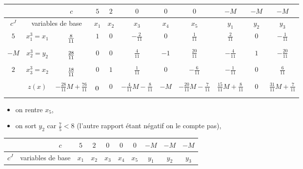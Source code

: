 \begin{td-sol}[]
\begin{enumerate}
\begin{center}
\begin{tabular}{|ccc|cccccccc|}
                \hline  %
                & \ &\(c\)&\(5\)&\(2\)&\(0\)&\(0\)&\(0\)&\(-M\)&\(-M\)&\(-M\)\\
                \hline %
                \multicolumn{1}{|c|}{\(c^J\)}& \multicolumn{2}{c|}{variables de base}&\(x_1\)&\(x_2\)&\(x_3\)&\(x_4\)&\(x_5\)&\(y_1\)&\(y_2\)&\(y_3\)\\
                \hline %
                \multicolumn{1}{|c|}{\(5\)}& \multicolumn{1}{c|}{\(x_1^{3}=x_1\)} &\(\vphantom{\dfrac16}\frac{8}{11}\)&\(1\)&\(0\)&\(-\frac{2}{11}\)&\(0\)&\(\frac{1}{11}\)&\(\frac{2}{11}\)&\(0\)&\(-\frac{1}{11}\)\\
                \hline %
                \multicolumn{1}{|c|}{\(-M\)}& \multicolumn{1}{c|}{\(x_2^{3}=y_2\)} &\(\vphantom{\dfrac16}\frac{28}{11}\)&\(0\)&\(0\)&\(\frac{4}{11}\)&\(-1\)&\(\frac{20}{11}\)&\(-\frac{4}{11}\)&\(1\)&\(-\frac{20}{11}\)\\
                \hline %
                \multicolumn{1}{|c|}{\(2\)}& \multicolumn{1}{c|}{\(x_3^{3}=x_2\)} &\(\vphantom{\dfrac16}\frac{18}{11}\)&\(0\)&\(1\)&\(\frac{1}{11}\)&\(0\)&\(-\frac{6}{11}\)&\(-\frac{1}{11}\)&\(0\)&\(\frac{6}{11}\)\\
                \hline %
                \multicolumn{1}{|c|}{} &\(z(x)\)& \multicolumn{1}{|c|}{\(-\frac{28}{11}M + \frac{76}{11}\)} &\(\vphantom{\dfrac16}0\)&\(0\)&\(-\frac{4}{11}M-\frac{8}{11}\)&\(-M\)&\(-\frac{20}{11}M-\frac{7}{11}\)&\(\frac{15}{11}M+\frac{8}{11}\)&\(0\)&\(\frac{31}{11}M+\frac{7}{11}\)\\
                \hline %
            \end{tabular}
        \end{center}
        \begin{itemize}
            \item on rentre \(x_5\),
            \item on sort \(y_2\) car \(\frac{7}{5} < 8\) (l'autre rapport
            étant négatif on le compte pas),
        \end{itemize}
        \becomes{}
        \begin{center}
            \begin{tabular}{|ccc|cccccccc|} %
                \hline  %
                & \ &\(c\)&\(5\)&\(2\)&\(0\)&\(0\)&\(0\)&\(-M\)&\(-M\)&\(-M\)\\
                \hline %
                \multicolumn{1}{|c|}{\(c^J\)}& \multicolumn{2}{c|}{variables de base}&\(x_1\)&\(x_2\)&\(x_3\)&\(x_4\)&\(x_5\)&\(y_1\)&\(y_2\)&\(y_3\)\\

\end{tabular}
\end{center}
\end{enumerate}
\end{td-sol}
